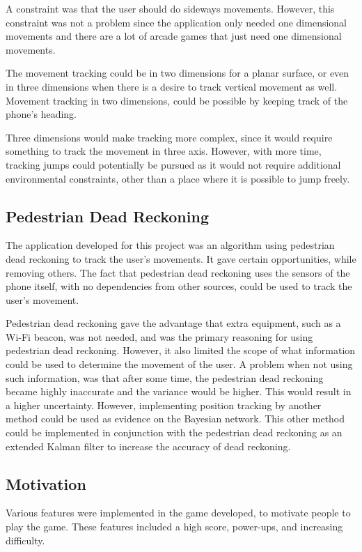 A constraint was that the user should do sideways movements.
However, this constraint was not a problem since the application only needed one dimensional movements and there are a lot of arcade games that just need one dimensional movements.

The movement tracking could be in two dimensions for a planar surface, or even in three dimensions when there is a desire to track vertical movement as well.
Movement tracking in two dimensions, could be possible by keeping track of the phone's heading.

Three dimensions would make tracking more complex, since it would require something to track the movement in three axis.
However, with more time, tracking jumps could potentially be pursued as it would not require additional environmental constraints, other than a place where it is possible to jump freely.

\subsection*{Pedestrian Dead Reckoning}
The application developed for this project was an algorithm using pedestrian dead reckoning to track the user's movements. 
It gave certain opportunities, while removing others.
The fact that pedestrian dead reckoning uses the sensors of the phone itself, with no dependencies from other sources, could be used to track the user's movement.

Pedestrian dead reckoning gave the advantage that extra equipment, such as a Wi-Fi beacon, was not needed, and was the primary reasoning for using pedestrian dead reckoning.
However, it also limited the scope of what information could be used to determine the movement of the user.
A problem when not using such information, was that after some time, the pedestrian dead reckoning became highly inaccurate and the variance would be higher. 
This would result in a higher uncertainty.
However, implementing position tracking by another method could be used as evidence on the Bayesian network. 
This other method could be implemented in conjunction with the pedestrian dead reckoning as an extended Kalman filter to increase the accuracy of dead reckoning. 

\subsection*{Motivation}
Various features were implemented in the game developed, to motivate people to play the game. 
These features included a high score, power-ups, and increasing difficulty.

